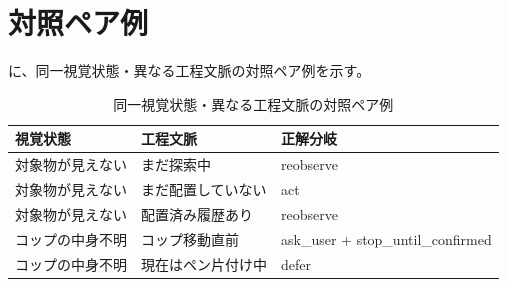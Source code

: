 \section{対照ペア例}

 に、同一視覚状態・異なる工程文脈の対照ペア例を示す。

\begin{table}[tbp]
\centering
\caption{同一視覚状態・異なる工程文脈の対照ペア例}
\label{tab:contrast_pairs}
\begin{tabularx}{\linewidth}{XXl}
\toprule
視覚状態 & 工程文脈 & 正解分岐 \\
\midrule
対象物が見えない & まだ探索中 & reobserve \\
対象物が見えない & まだ配置していない & act \\
対象物が見えない & 配置済み履歴あり & reobserve \\
コップの中身不明 & コップ移動直前 & ask\_user + stop\_until\_confirmed \\
コップの中身不明 & 現在はペン片付け中 & defer \\
\bottomrule
\end{tabularx}
\end{table}
